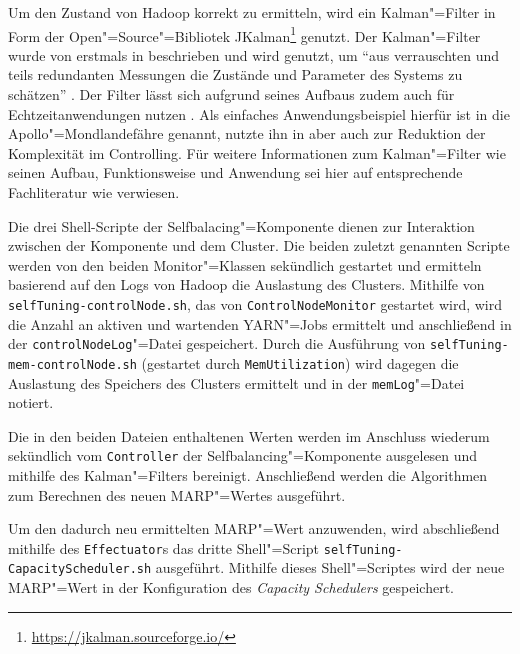 Um den Zustand von Hadoop korrekt zu ermitteln, wird ein Kalman"=Filter in Form der Open"=Source"=Bibliotek JKalman\footnote{\url{https://jkalman.sourceforge.io/}} genutzt.
Der Kalman"=Filter wurde von \citeauthor{Kalman1960} erstmals in \cite{Kalman1960} beschrieben und wird genutzt, um \enquote{aus verrauschten und teils redundanten Messungen die Zustände und Parameter des Systems zu schätzen} \cite{Marchthaler2017}.
Der Filter lässt sich aufgrund seines Aufbaus zudem auch für Echtzeitanwendungen nutzen \cite{Marchthaler2017}.
Als einfaches Anwendungsbeispiel hierfür ist in \cite{Marchthaler2017} die Apollo"=Mondlandefähre genannt, \citeauthor{Strukov2001} nutzte ihn in \cite{Strukov2001} aber auch zur Reduktion der Komplexität im Controlling.
Für weitere Informationen zum Kalman"=Filter wie seinen Aufbau, Funktionsweise und Anwendung sei hier auf entsprechende Fachliteratur wie \zB \cite{Kim2016,Simon2006,Aggoun2004} verwiesen.

Die drei Shell-Scripte der Selfbalacing"=Komponente dienen zur Interaktion zwischen der Komponente und dem Cluster.
Die beiden zuletzt genannten Scripte werden von den beiden Monitor"=Klassen sekündlich gestartet und ermitteln basierend auf den Logs von Hadoop die Auslastung des Clusters.
Mithilfe von \texttt{selfTuning-controlNode.sh}, das von \texttt{ControlNodeMonitor} gestartet wird, wird die Anzahl an aktiven und wartenden YARN"=Jobs ermittelt und anschließend in der \texttt{controlNodeLog}"=Datei gespeichert.
Durch die Ausführung von \texttt{selfTuning-mem-controlNode.sh} (gestartet durch \texttt{MemUtilization}) wird dagegen die Auslastung des Speichers des Clusters ermittelt und in der \texttt{memLog}"=Datei notiert.

Die in den beiden Dateien enthaltenen Werten werden im Anschluss wiederum sekündlich vom \texttt{Controller} der Selfbalancing"=Komponente ausgelesen und mithilfe des Kalman"=Filters bereinigt.
Anschließend werden die Algorithmen \cite{Zhang2016} zum Berechnen des neuen \gls{MARP}"=Wertes ausgeführt.

Um den dadurch neu ermittelten \gls{MARP}"=Wert anzuwenden, wird abschließend mithilfe des \texttt{Effectuator}s das dritte Shell"=Script \texttt{selfTuning-CapacityScheduler.sh} ausgeführt.
Mithilfe dieses Shell"=Scriptes wird der neue MARP"=Wert in der Konfiguration des \emph{Capacity Schedulers} gespeichert.
